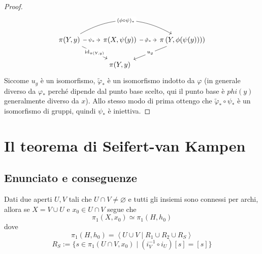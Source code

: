 \begin{proof}
\begin{equation*}
	\begin{tikzcd}
	{\pi(Y,y)} \arrow[rd, "{\operatorname{id}_{\pi(Y,y)}}" description] \arrow[r, "\psi_*" description] \arrow[rr, "(\phi\circ\psi)_*" description, bend left] & {\pi(X,\psi(y))} \arrow[r, "\tilde{\varphi}_*" description] & {\pi\left(Y,\phi(\psi(y))\right))} \arrow[ld, "u_g" description] \\
	& {\pi(Y,y)}                                                  &                                                                 
	\end{tikzcd}
	\end{equation*}
	Siccome $u_g$ è un isomorfismo, $\tilde{\varphi}_*$ è un isomorfismo indotto da $\varphi$ (in generale diverso da $\varphi_*$ perché dipende dal punto base scelto, qui il punto base è $phi(y)$ generalmente diverso da $x$). Allo stesso modo di prima ottengo che $\tilde{\varphi}_*\circ\psi_* $ è un isomorfismo di gruppi, quindi $\psi_*$ è iniettiva.
\end{proof}





\section{Il teorema di Seifert-van Kampen}
\subsection{\textcolor{TopAlg}{\textbf{Enunciato e conseguenze}}}


\begin{theorem}
	Dati due aperti $U, V$ tali che $U \cap V \neq \varnothing$ e tutti gli insiemi sono connessi per archi, allora se $X = V \cup U$ e $x_0 \in U\cap V$ segue che 
	\begin{equation*}
		\pi_1(X, x_0) \simeq \pi_1(H, h_0)
	\end{equation*} 
	dove 
	\begin{equation*}
	\pi_1(H,h_0) = \left\langle U \cup V \mid R_1 \cup R_2 \cup R_S \right\rangle
	\end{equation*}
	\begin{equation*}
	R_S := \{s \in \pi_1(U \cap V,x_0) \mid (i^{-1}_V \circ i_{U}) \left[s\right] = \left[s\right]\}
	\end{equation*}
\end{theorem}

